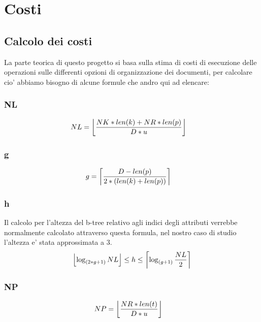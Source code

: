 \chapter{Costi}

\section{Calcolo dei costi}

La parte teorica di questo progetto si basa sulla stima di costi di esecuzione delle operazioni sulle differenti opzioni di organizzazione dei documenti, per calcolare cio' 
abbiamo bisogno di alcune formule che andro qui ad elencare:  

\subsection{NL}
    \begin{equation*}
        \begin{aligned}
        NL &=\floor*{\frac{NK * len(k) + NR * len(p)}{D * u}}
        \end{aligned}
        \end{equation*}
\subsection{g}
    \begin{equation*}
        \begin{aligned}
        g &=\ceil*{\frac{D - len(p)}{2 * (len(k) + len(p))}}
        \end{aligned}
        \end{equation*}
\subsection{h}
Il calcolo per l'altezza del b-tree relativo agli indici degli attributi verrebbe normalmente calcolato attraverso questa formula, nel nostro caso di studio l'altezza e' stata approssimata a 3.
    \begin{equation*}
        \begin{aligned}
        \floor*{\log_{(2*g + 1)}{NL}} \leq h \leq \ceil*{\log_{(g + 1)}{\frac{NL}{2}}}
        \end{aligned}
        \end{equation*}
\subsection{NP}
    \begin{equation*}
        \begin{aligned}
        NP &=\floor*{\frac{NR * len(t)}{D * u}}
        \end{aligned}
        \end{equation*}
